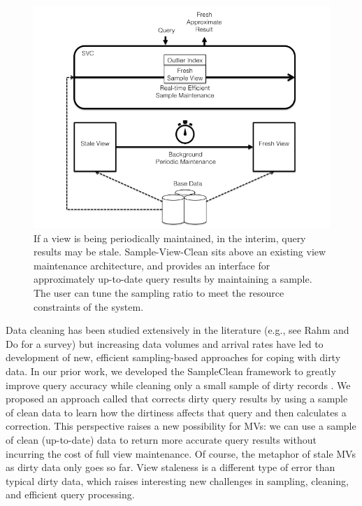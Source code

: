 \begin{figure}[t] \vspace{-2em}
\centering
 \includegraphics[scale=0.20]{figs/sys-arch.png} \vspace{-.25em}
 \caption{If a view is being periodically maintained, in the interim, query results may be stale. Sample-View-Clean sits above an existing view maintenance architecture, and provides an interface for approximately up-to-date query results by maintaining a sample. The user can tune the sampling ratio to meet the resource constraints of the system.\label{sys-arch}}\vspace{-1.75em}
\end{figure}

Data cleaning has been studied extensively in the literature (e.g., see Rahm and Do for a survey\cite{rahm2000data}) but increasing data volumes and arrival rates have led to development of new, efficient sampling-based approaches for coping with dirty data.   
In our prior work, we developed the SampleClean framework to greatly improve query accuracy while cleaning only a small sample of dirty records \cite{wang1999sample}.  
We proposed an approach called \nsc that corrects dirty query results by using a sample of clean data to learn how the dirtiness affects that query and then calculates a correction.  
This perspective raises a new possibility for MVs: we can use a sample of clean (up-to-date) data to return more accurate query results without incurring the cost of full view maintenance.
Of course, the metaphor of stale MVs as dirty data only goes so far. 
View staleness is a different type of error than typical dirty data, which raises interesting new challenges in sampling, cleaning, and efficient query processing.

